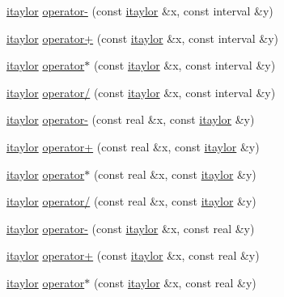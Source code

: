 \begin{DoxyCompactItemize}
\hyperlink{classtaylor_1_1itaylor}{itaylor} \hyperlink{classtaylor_1_1itaylor_a7bf24c7edf481b2cb1bc700704728805}{operator-\/} (const \hyperlink{classtaylor_1_1itaylor}{itaylor} \&x, const interval \&y)
\item 
\hyperlink{classtaylor_1_1itaylor}{itaylor} \hyperlink{classtaylor_1_1itaylor_ac2c50431cad3b55e0fd6ecd0e49f15c2}{operator+} (const \hyperlink{classtaylor_1_1itaylor}{itaylor} \&x, const interval \&y)
\item 
\hyperlink{classtaylor_1_1itaylor}{itaylor} \hyperlink{classtaylor_1_1itaylor_aac7006c7eef8c32b26dc2610d5d487c6}{operator$\ast$} (const \hyperlink{classtaylor_1_1itaylor}{itaylor} \&x, const interval \&y)
\item 
\hyperlink{classtaylor_1_1itaylor}{itaylor} \hyperlink{classtaylor_1_1itaylor_aa9754401400a0551800495335c4997f4}{operator/} (const \hyperlink{classtaylor_1_1itaylor}{itaylor} \&x, const interval \&y)
\item 
\hyperlink{classtaylor_1_1itaylor}{itaylor} \hyperlink{classtaylor_1_1itaylor_a2527a23e12002ac1e22143704babbbdc}{operator-\/} (const real \&x, const \hyperlink{classtaylor_1_1itaylor}{itaylor} \&y)
\item 
\hyperlink{classtaylor_1_1itaylor}{itaylor} \hyperlink{classtaylor_1_1itaylor_ae02d6346af134135469fbbf8cd5b0498}{operator+} (const real \&x, const \hyperlink{classtaylor_1_1itaylor}{itaylor} \&y)
\item 
\hyperlink{classtaylor_1_1itaylor}{itaylor} \hyperlink{classtaylor_1_1itaylor_a2161263e12cadbf1f5b44a6e50370d60}{operator$\ast$} (const real \&x, const \hyperlink{classtaylor_1_1itaylor}{itaylor} \&y)
\item 
\hyperlink{classtaylor_1_1itaylor}{itaylor} \hyperlink{classtaylor_1_1itaylor_a430a28502969167967b0a8344636624d}{operator/} (const real \&x, const \hyperlink{classtaylor_1_1itaylor}{itaylor} \&y)
\item 
\hyperlink{classtaylor_1_1itaylor}{itaylor} \hyperlink{classtaylor_1_1itaylor_ad0cc7998df32baffaaa78019a3f8791a}{operator-\/} (const \hyperlink{classtaylor_1_1itaylor}{itaylor} \&x, const real \&y)
\item 
\hyperlink{classtaylor_1_1itaylor}{itaylor} \hyperlink{classtaylor_1_1itaylor_a1b991862783a37079712e79fd5ba2c52}{operator+} (const \hyperlink{classtaylor_1_1itaylor}{itaylor} \&x, const real \&y)
\item 
\hyperlink{classtaylor_1_1itaylor}{itaylor} \hyperlink{classtaylor_1_1itaylor_a996ffe24777fc20ee48b0754793f72d5}{operator$\ast$} (const \hyperlink{classtaylor_1_1itaylor}{itaylor} \&x, const real \&y)

\end{DoxyCompactItemize}
